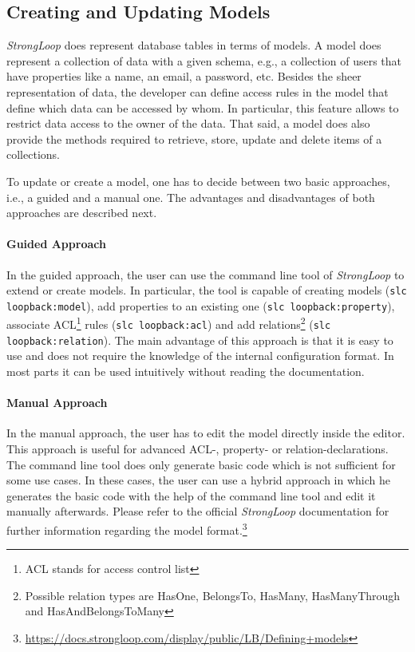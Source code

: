 \documentclass[nochapterpage,nopartpage,noheadingspace,numbersubsubsec,bigchapter,colorback,accentcolor=tud9c,10pt]{tudreport}
\begin{document}
  \subsection{Creating and Updating Models}
  \label{sec:tech:implementation:strongloop:models}

    \emph{StrongLoop} does represent database tables in terms of models. A model does represent a collection of data with a given schema, e.g., a collection of users that have properties like a name, an email, a password, etc. Besides the sheer representation of data, the developer can define access rules in the model that define which data can be accessed by whom. In particular, this feature allows to restrict data access to the owner of the data. That said, a model does also provide the methods required to retrieve, store, update and delete items of a collections.

    To update or create a model, one has to decide between two basic approaches, i.e., a guided and a manual one. The advantages and disadvantages of both approaches are described next.

  \paragraph{Guided Approach}
    In the guided approach, the user can use the command line tool of \emph{StrongLoop} to extend or create models. In particular, the tool is capable of creating models (\texttt{slc loopback:model}), add properties to an existing one (\texttt{slc loopback:property}), associate ACL\footnote{ACL stands for access control list} rules (\texttt{slc loopback:acl}) and add relations\footnote{Possible relation types are HasOne, BelongsTo, HasMany, HasManyThrough and HasAndBelongsToMany} (\texttt{slc loopback:relation}). The main advantage of this approach is that it is easy to use and does not require the knowledge of the internal configuration format. In most parts it can be used intuitively without reading the documentation.

  \paragraph{Manual Approach}
    In the manual approach, the user has to edit the model directly inside the editor. This approach is useful for advanced ACL-, property- or relation-declarations. The command line tool does only generate basic code which is not sufficient for some use cases. In these cases, the user can use a hybrid approach in which he generates the basic code with the help of the command line tool and edit it manually afterwards. Please refer to the official \emph{StrongLoop} documentation for further information regarding the model format.\footnote{\url{https://docs.strongloop.com/display/public/LB/Defining+models}}
\end{document}
